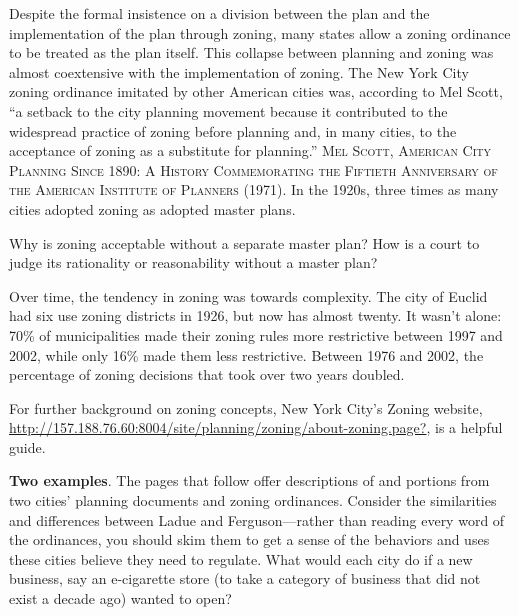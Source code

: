 
\item
Despite the formal insistence on a division between the plan and the
implementation of the plan through zoning, many states allow a zoning ordinance
to be treated as the plan itself. This collapse between planning and zoning was
almost coextensive with the implementation of zoning. The New York City zoning
ordinance imitated by other American cities was, according to Mel Scott, ``a
setback to the city planning movement because it contributed to the widespread
practice of zoning before planning and, in many cities, to the acceptance of
zoning as a substitute for planning.'' \textsc{Mel Scott, American City Planning
Since 1890: A History Commemorating the Fiftieth Anniversary of the American
Institute of Planners} (1971). In the 1920s, three times as many cities adopted
zoning as adopted master plans.

Why is zoning acceptable without a separate master plan? How is a court to judge
its rationality or reasonability without a master plan?

\item
Over time, the tendency in zoning was towards complexity. The city of Euclid had
six use zoning districts in 1926, but now has almost twenty. It wasn't alone:
70\% of municipalities made their zoning rules more restrictive between 1997 and
2002, while only 16\% made them less restrictive. Between 1976 and 2002, the
percentage of zoning decisions that took over two years doubled.

\item
For further background on zoning concepts, New York City's Zoning website,
\url{http://157.188.76.60:8004/site/planning/zoning/about-zoning.page?}, is a
helpful guide.

\item
\textbf{Two examples}. The pages that follow offer descriptions of and portions
from two cities' planning documents and zoning ordinances. Consider the
similarities and differences between Ladue and Ferguson---rather than reading
every word of the ordinances, you should skim them to get a sense of the
behaviors and uses these cities believe they need to regulate. What would each
city do if a new business, say an e-cigarette store (to take a category of
business that did not exist a decade ago) wanted to open?


